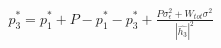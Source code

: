 \documentclass[preview]{standalone}
\begin{document}
\begin{align*}
p_3^\ast = p_1^\ast + P - p_1^\ast - p_3^\ast + \frac{P \sigma_\epsilon^2 + W_{tot} \sigma^2}{\left|\hat{h_3}\right|^2}
\end{align*}
\end{document}
